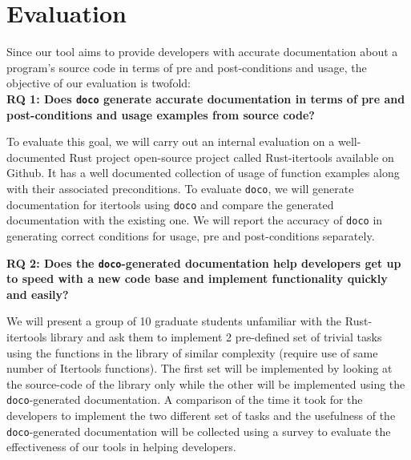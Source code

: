 \section{Evaluation}

Since our tool aims to provide developers with accurate documentation about a program's source code in terms of pre and post-conditions and usage, the objective of our evaluation is twofold:\\
\newline
{\bf RQ 1: Does \texttt{doco} generate accurate documentation in terms of pre and post-conditions and usage examples from source code?}

To evaluate this goal, we will carry out an internal evaluation on a well-documented Rust project open-source project called Rust-itertools available on Github.\cite{bluss:2018} It has a well documented collection of usage of function examples along with their associated preconditions. To evaluate \texttt{doco}, we will generate documentation for itertools using \texttt{doco} and compare the generated documentation with the existing one. We will report the accuracy of \texttt{doco} in generating correct conditions for usage, pre and post-conditions separately.\newline

{\bf RQ 2: Does the \texttt{doco}-generated documentation help developers get up to speed with a new code base and implement functionality quickly and easily?}

We will present a group of 10 graduate students unfamiliar with the Rust-itertools library and ask them to implement 2 pre-defined set of trivial tasks using the functions in the library of similar complexity (require use of same number of Itertools functions). The first set will be implemented by looking at the source-code of the library only while the other will be implemented using the \texttt{doco}-generated documentation. A comparison of the time it took for the developers to implement the two different set of tasks and the usefulness of the \texttt{doco}-generated documentation will be collected using a survey to evaluate the effectiveness of our tools in helping developers.

